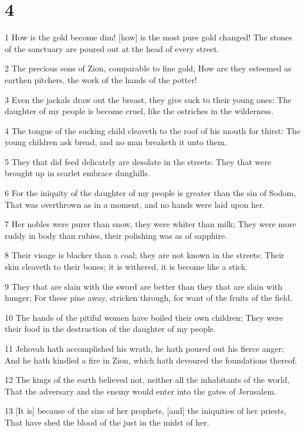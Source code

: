 \chapter{4}

\par 1 How is the gold become dim! [how] is the most pure gold changed! The stones of the sanctuary are poured out at the head of every street.
\par 2 The precious sons of Zion, comparable to fine gold, How are they esteemed as earthen pitchers, the work of the hands of the potter!
\par 3 Even the jackals draw out the breast, they give suck to their young ones: The daughter of my people is become cruel, like the ostriches in the wilderness.
\par 4 The tongue of the sucking child cleaveth to the roof of his mouth for thirst: The young children ask bread, and no man breaketh it unto them.
\par 5 They that did feed delicately are desolate in the streets: They that were brought up in scarlet embrace dunghills.
\par 6 For the iniquity of the daughter of my people is greater than the sin of Sodom, That was overthrown as in a moment, and no hands were laid upon her.
\par 7 Her nobles were purer than snow, they were whiter than milk; They were more ruddy in body than rubies, their polishing was as of sapphire.
\par 8 Their visage is blacker than a coal; they are not known in the streets: Their skin cleaveth to their bones; it is withered, it is become like a stick.
\par 9 They that are slain with the sword are better than they that are slain with hunger; For these pine away, stricken through, for want of the fruits of the field.
\par 10 The hands of the pitiful women have boiled their own children; They were their food in the destruction of the daughter of my people.
\par 11 Jehovah hath accomplished his wrath, he hath poured out his fierce anger; And he hath kindled a fire in Zion, which hath devoured the foundations thereof.
\par 12 The kings of the earth believed not, neither all the inhabitants of the world, That the adversary and the enemy would enter into the gates of Jerusalem.
\par 13 [It is] because of the sins of her prophets, [and] the iniquities of her priests, That have shed the blood of the just in the midst of her.
